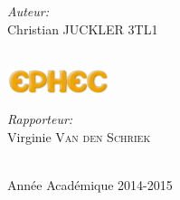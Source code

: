 \begin{titlepage}
\begin{minipage}{0.4\textwidth}
\begin{flushleft} \large
\emph{Auteur:}\\
Christian \textsc{JUCKLER} 3TL1 %
\end{flushleft}
\end{minipage}\\
\includegraphics{ephec.png}\\
\begin{minipage}{0.4\textwidth}
\begin{flushleft} \large
\emph{Rapporteur:} \\
Virginie \textsc{Van den Schriek} %
\end{flushleft}
\end{minipage}\\[4cm]



{\large Année Académique 2014-2015}\\[3cm] %

\vfill %

\end{titlepage}